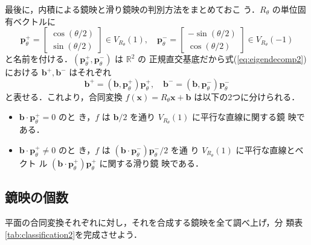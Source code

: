 \documentclass[11pt, uplatex, dvipdfmx, titlepage]{jsarticle}
\theoremstyle{definition}
\newtheorem{theorem}{定理}[section]
\newtheorem*{definition}{定義}
\begin{document}
 最後に，内積による鏡映と滑り鏡映の判別方法をまとめておこ
 う．$R_{\theta}$ の単位固有ベクトルに
 \[
   \bm{p}^{+}_{\theta} = \left[
     \begin{array}{r}
       \cos(\theta/2)\\
       \sin(\theta/2)
     \end{array}
   \right] \in V_{R_{\theta}}(1), \quad \bm{p}^{-}_{\theta} = \left[
     \begin{array}{r}
       -\sin(\theta/2)\\
       \cos(\theta/2)
     \end{array}
   \right] \in V_{R_{\theta}}(-1)
 \]
 と名前を付ける．$\left(\bm{p}_{\theta}^{+}, \bm{p}_{\theta}^{-}\right)$ は $\mathbb{R}^2$ の
 正規直交基底だから式(\ref{eq:eigendecomp2})における $\bm{b}^{+},
 \bm{b}^{-}$ はそれぞれ
 \[
   \bm{b}^{+} = (\bm{b}, \bm{p}_{\theta}^{+}) \bm{p}_{\theta}^{+} ,
   \quad  \bm{b}^{-} =  (\bm{b}, \bm{p}_{\theta}^{-})\bm{p}_{\theta}^{-}
 \]
 と表せる．これより，合同変換 $f(\bm{x}) = R_{\theta} \bm{x} + \bm{b}$
 は以下の2つに分けられる．
 \begin{itemize}
   \setlength{\itemsep}{1zh}
 \item $\bm{b} \cdot \bm{p}_{\theta}^{+}=0$ のと
   き，$f$ は $\bm{b}/2$ を通り $V_{R_{\theta}}(1)$ に平行な直線に関する鏡
   映である．
   
 \item $\bm{b} \cdot  \bm{p}_{\theta}^{+} \neq 0$ のと
   き，$f$ は
   $\left(\bm{b} \cdot \bm{p}_{\theta}^{-}\right)\bm{p}_{\theta}^{-}/2$ を通
   り $V_{R_{\theta}}(1)$ に平行な直線とベクト
   ル $(\bm{b}\cdot \bm{p}_{\theta}^{+})\bm{p}_{\theta}^{+}$ に関する滑り鏡
   映である．
 \end{itemize}



\subsection{鏡映の個数}

平面の合同変換それぞれに対し，それを合成する鏡映を全て調べ上げ，分
類表\ref{tab:classification2}を完成させよう．


\end{document}
